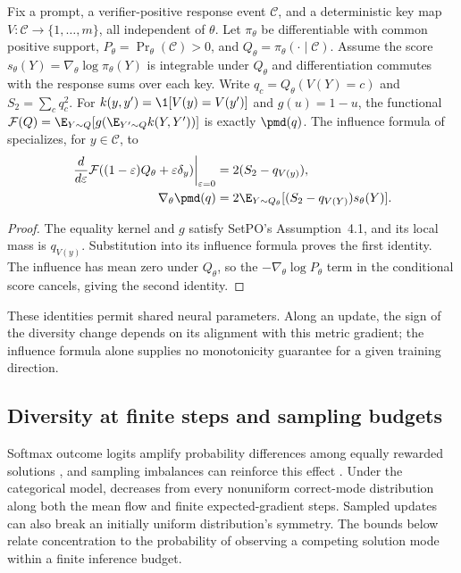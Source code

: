\begin{corollary}
\enforcehalffinalproseline
\label{cor:pcmd-setpo-neural}
Fix a prompt, a verifier-positive response event $\mathcal C$, and a
deterministic key map $V:\mathcal C\to\{1,\ldots,m\}$, all independent
of $\theta$. Let $\pi_\theta$ be differentiable with common positive support,
$P_\theta=\Pr_\theta(\mathcal C)>0$, and
$Q_\theta=\pi_\theta(\cdot\mid\mathcal C)$. Assume the score
$s_\theta(Y)=\nabla_\theta\log\pi_\theta(Y)$ is integrable under $Q_\theta$
and differentiation commutes with the response sums over each key.
Write $q_c=Q_\theta(V(Y)=c)$ and $S_2=\sum_cq_c^2$.
For $k(y,y')=\1[V(y)=V(y')]$ and $g(u)=1-u$, the functional
$\mathcal F(Q)=\E_{Y\sim Q}[g(\E_{Y'\sim Q}k(Y,Y'))]$ is exactly
$\pmd(q)$. The influence formula of
\citet[Theorem~4.2, v1]{li2026setpo} specializes, for $y\in\mathcal C$, to
\begin{align}
 \left.\frac{d}{d\varepsilon}
  \mathcal F((1-\varepsilon)Q_\theta+\varepsilon\delta_y)
  \right|_{\varepsilon=0}
 &=2(S_2-q_{V(y)}),\label{eq:pcmd-setpo-influence}\\
 \nabla_\theta\pmd(q)
 &=2\E_{Y\sim Q_\theta}
       [(S_2-q_{V(Y)})s_\theta(Y)].
 \label{eq:pcmd-neural-gradient}
\end{align}
\end{corollary}
\begin{proof}
\enforcehalffinalproseline
The equality kernel and $g$ satisfy SetPO's Assumption~4.1, and its local
mass is $q_{V(y)}$. Substitution into its influence formula proves the first
identity. The influence has mean zero under $Q_\theta$, so the
$-\nabla_\theta\log P_\theta$ term in the conditional score cancels,
giving the second identity.
\end{proof}
These identities permit shared neural parameters. Along an update, the
sign of the diversity change depends on its alignment with this metric
gradient; the influence formula alone supplies no monotonicity guarantee
for a given training direction.

\subsection{Diversity at finite steps and sampling budgets}
\label{app:finite-time-diversity}

Softmax outcome logits amplify probability differences among equally rewarded
solutions \citep[Theorem~3.1 and App.~A.1]{sinha2026expected}, and
sampling imbalances can reinforce this effect
\citep[Section~4.2]{lochab2026ucpo}. Under the categorical model,
\pmd{} decreases from every nonuniform correct-mode distribution along
both the mean flow and finite expected-gradient steps. Sampled updates can
also break an initially uniform distribution's symmetry. The bounds below
relate concentration to the probability of observing a competing solution
mode within a finite inference budget.


